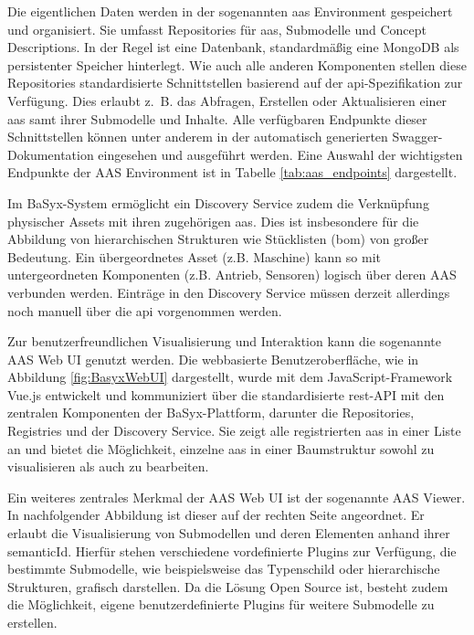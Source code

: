 \newpage
Die eigentlichen Daten werden in der sogenannten \acs{aas} Environment gespeichert und organisiert.
Sie umfasst Repositories für \acs{aas}, Submodelle und Concept Descriptions.
In der Regel ist eine Datenbank, standardmäßig eine MongoDB als persistenter Speicher hinterlegt.
Wie auch alle anderen Komponenten stellen diese Repositories standardisierte Schnittstellen basierend auf der \ac{api}-Spezifikation zur Verfügung.
Dies erlaubt z.~B. das Abfragen, Erstellen oder Aktualisieren einer \acs{aas} samt ihrer Submodelle und Inhalte.
Alle verfügbaren Endpunkte dieser Schnittstellen können unter anderem in der automatisch generierten Swagger-Dokumentation eingesehen und ausgeführt werden. 
Eine Auswahl der wichtigsten Endpunkte der AAS Environment ist in Tabelle \ref{tab:aas_endpoints} dargestellt.


\vspace{-0.75em}

Im BaSyx-System ermöglicht ein Discovery Service zudem die Verknüpfung physischer Assets mit ihren zugehörigen \acs{aas}.
Dies ist insbesondere für die Abbildung von hierarchischen Strukturen wie Stücklisten (\ac{bom}) von großer Bedeutung.
Ein übergeordnetes Asset (z.B. Maschine) kann so mit untergeordneten Komponenten (z.B. Antrieb, Sensoren) logisch über deren AAS verbunden werden.
Einträge in den Discovery Service müssen derzeit allerdings noch manuell über die \acs{api} vorgenommen werden.

Zur benutzerfreundlichen Visualisierung und Interaktion kann die sogenannte AAS Web UI genutzt werden.
Die webbasierte Benutzeroberfläche, wie in Abbildung \ref{fig:BasyxWebUI} dargestellt, wurde mit dem JavaScript-Framework Vue.js entwickelt und kommuniziert über die standardisierte \acs{rest}-API mit den zentralen Komponenten der BaSyx-Plattform, darunter die Repositories, Registries und der Discovery Service.
Sie zeigt alle registrierten \acs{aas} in einer Liste an und bietet die Möglichkeit, einzelne \acs{aas} in einer Baumstruktur sowohl zu visualisieren als auch zu bearbeiten. 

Ein weiteres zentrales Merkmal der AAS Web UI ist der sogenannte AAS Viewer.
In nachfolgender Abbildung ist dieser auf der rechten Seite angeordnet.
Er erlaubt die Visualisierung von Submodellen und deren Elementen anhand ihrer semanticId. 
Hierfür stehen verschiedene vordefinierte Plugins zur Verfügung, die bestimmte Submodelle, wie beispielsweise das Typenschild oder hierarchische Strukturen, grafisch darstellen.
Da die Lösung Open Source ist, besteht zudem die Möglichkeit, eigene benutzerdefinierte Plugins für weitere Submodelle zu erstellen. \cite{BaSyxWiki,BaSyxEclipse} 

